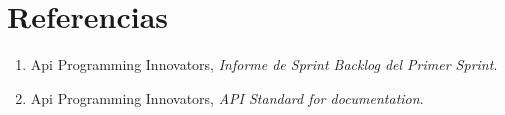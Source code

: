 \documentclass[12pt,letterpaper]{article}
\begin{document}

\section{Referencias}
\begin{enumerate}
    \item  Api Programming Innovators, \emph{Informe de Sprint Backlog del Primer Sprint}.
    \item  Api Programming Innovators, \emph{API Standard for documentation}.
\end{enumerate}
\end{document}
